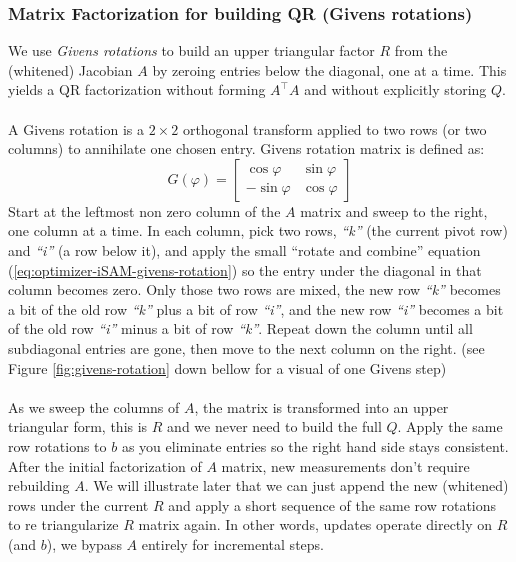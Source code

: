 \subsubsection{Matrix Factorization for building QR (Givens rotations)}
We use \emph{Givens rotations} to build an upper triangular factor $R$ from the (whitened) Jacobian $A$ by zeroing entries below the diagonal, one at a time. This yields a QR factorization without forming $A^\top A$ and without explicitly storing $Q$.
\\ \\
A Givens rotation is a $2\times 2$ orthogonal transform applied to two rows (or two columns) to annihilate one chosen entry. Givens rotation matrix is defined as:
\begin{equation}
    G(\varphi) =
    \begin{bmatrix}
        \cos\varphi & \sin\varphi \\
        -\sin\varphi & \cos\varphi
    \end{bmatrix}
    \label{eq:optimizer-iSAM-givens-rotation}
\end{equation}
Start at the leftmost non zero column of the $A$ matrix and sweep to the right, one column at a time. In each column, pick two rows, \textit{``k''} (the current pivot row) and \textit{``i''} (a row below it), and apply the small ``rotate and combine'' equation (\ref{eq:optimizer-iSAM-givens-rotation}) so the entry under the diagonal in that column becomes zero. Only those two rows are mixed, the new row \textit{``k''} becomes a bit of the old row \textit{``k''} plus a bit of row \textit{``i''}, and the new row \textit{``i''} becomes a bit of the old row \textit{``i''} minus a bit of row \textit{``k''}. Repeat down the column until all subdiagonal entries are gone, then move to the next column on the right. (see Figure \ref{fig:givens-rotation} down bellow for a visual of one Givens step)
\\ \\
As we sweep the columns of $A$, the matrix is transformed into an upper triangular form, this is $R$ and we never need to build the full $Q$. Apply the same row rotations to $b$ as you eliminate entries so the right hand side stays consistent. After the initial factorization of $A$ matrix, new measurements don't require rebuilding $A$. We will illustrate later that we can just append the new (whitened) rows under the current $R$ and apply a short sequence of the same row rotations to re triangularize $R$ matrix again. In other words, updates operate directly on $R$ (and $b$), we bypass $A$ entirely for incremental steps.
